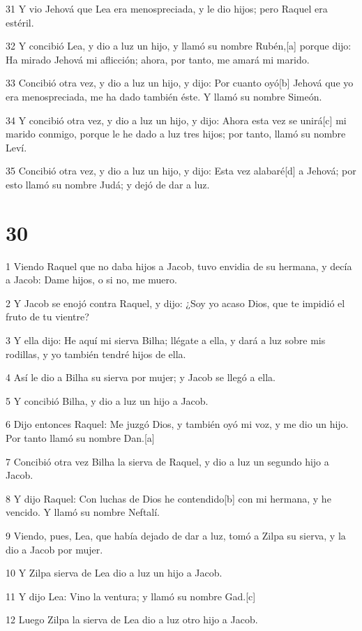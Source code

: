 31 Y vio Jehová que Lea era menospreciada, y le dio hijos; pero Raquel era estéril.

32 Y concibió Lea, y dio a luz un hijo, y llamó su nombre Rubén,[a] porque dijo: Ha mirado Jehová mi aflicción; ahora, por tanto, me amará mi marido.

33 Concibió otra vez, y dio a luz un hijo, y dijo: Por cuanto oyó[b] Jehová que yo era menospreciada, me ha dado también éste. Y llamó su nombre Simeón.

34 Y concibió otra vez, y dio a luz un hijo, y dijo: Ahora esta vez se unirá[c] mi marido conmigo, porque le he dado a luz tres hijos; por tanto, llamó su nombre Leví.

35 Concibió otra vez, y dio a luz un hijo, y dijo: Esta vez alabaré[d] a Jehová; por esto llamó su nombre Judá; y dejó de dar a luz.

\chapter{30}

1 Viendo Raquel que no daba hijos a Jacob, tuvo envidia de su hermana, y decía a Jacob: Dame hijos, o si no, me muero.

2 Y Jacob se enojó contra Raquel, y dijo: ¿Soy yo acaso Dios, que te impidió el fruto de tu vientre?

3 Y ella dijo: He aquí mi sierva Bilha; llégate a ella, y dará a luz sobre mis rodillas, y yo también tendré hijos de ella.

4 Así le dio a Bilha su sierva por mujer; y Jacob se llegó a ella.

5 Y concibió Bilha, y dio a luz un hijo a Jacob.

6 Dijo entonces Raquel: Me juzgó Dios, y también oyó mi voz, y me dio un hijo. Por tanto llamó su nombre Dan.[a]

7 Concibió otra vez Bilha la sierva de Raquel, y dio a luz un segundo hijo a Jacob.

8 Y dijo Raquel: Con luchas de Dios he contendido[b] con mi hermana, y he vencido. Y llamó su nombre Neftalí.

9 Viendo, pues, Lea, que había dejado de dar a luz, tomó a Zilpa su sierva, y la dio a Jacob por mujer.

10 Y Zilpa sierva de Lea dio a luz un hijo a Jacob.

11 Y dijo Lea: Vino la ventura; y llamó su nombre Gad.[c]

12 Luego Zilpa la sierva de Lea dio a luz otro hijo a Jacob.


